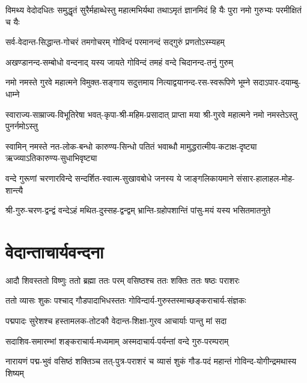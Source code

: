 \twolineshloka
{विमथ्य वेदोदधितः समुद्धृतं सुरैर्महाब्धेस्तु महात्मभिर्यथा}
{तथाऽमृतं ज्ञानमिदं हि यैः पुरा नमो गुरुभ्यः परमीक्षितं च यैः}


\twolineshloka
{सर्व-वेदान्त-सिद्धान्त-गोचरं तमगोचरम्}
{गोविन्दं परमानन्दं सद्गुरुं प्रणतोऽस्म्यहम्}

\twolineshloka
{अखण्डानन्द-सम्बोधो वन्दनाद् यस्य जायते}
{गोविन्दं तमहं वन्दे चिदानन्द-तनुं गुरुम्}

\fourlineindentedshloka
{नमो नमस्ते गुरवे महात्मने}
{विमुक्त-सङ्गाय सदुत्तमाय}
{नित्याद्वयानन्द-रस-स्वरूपिणे}
{भूम्ने सदाऽपार-दयाम्बु-धाम्ने}

\fourlineindentedshloka
{स्वाराज्य-साम्राज्य-विभूतिरेषा}
{भवत्-कृपा-श्री-महिम-प्रसादात्}
{प्राप्ता मया श्री-गुरवे महात्मने}
{नमो नमस्तेऽस्तु पुनर्नमोऽस्तु}

\fourlineindentedshloka
{स्वामिन् नमस्ते नत-लोक-बन्धो}
{कारुण्य-सिन्धो पतितं भवाब्धौ}
{मामुद्धरात्मीय-कटाक्ष-दृष्ट्या}
{ऋज्व्याऽतिकारुण्य-सुधाभिवृष्ट्या}


\fourlineindentedshloka
{वन्दे गुरूणां चरणारविन्दे}
{सन्दर्शित-स्वात्म-सुखावबोधे}
{जनस्य ये जाङ्गलिकायमाने}
{संसार-हालाहल-मोह-शान्त्यै}


\twolineshloka
{श्री-गुरु-चरण-द्वन्द्वं वन्देऽहं मथित-दुस्सह-द्वन्द्वम्}
{भ्रान्ति-ग्रहोपशान्तिं पांसु-मयं यस्य भसितमातनुते}


\section{वेदान्ताचार्यवन्दना}

\twolineshloka
{आदौ शिवस्ततो विष्णुः ततो ब्रह्मा ततः परम्}
{वसिष्ठश्च ततः शक्तिः ततः षष्ठः पराशरः}

\twolineshloka
{ततो व्यासः शुकः पश्चाद् गौडपादाभिधस्ततः}
{गोविन्दार्य-गुरुस्तस्माच्छङ्कराचार्य-संज्ञकः}

\twolineshloka
{पद्मपादः सुरेशश्च हस्तामलक-तोटकौ}
{वेदान्त-शिक्षा-गुरव आचार्याः पान्तु मां सदा}


\twolineshloka
{सदाशिव-समारम्भां शङ्कराचार्य-मध्यमाम्}
{अस्मदाचार्य-पर्यन्तां वन्दे गुरु-परम्पराम्}

\fourlineindentedshloka
{नारायणं पद्म-भुवं वसिष्ठं}
{शक्तिञ्च तत्-पुत्र-पराशरं च}
{व्यासं शुकं गौड-पदं महान्तं}
{गोविन्द-योगीन्द्रमथास्य शिष्यम्}

